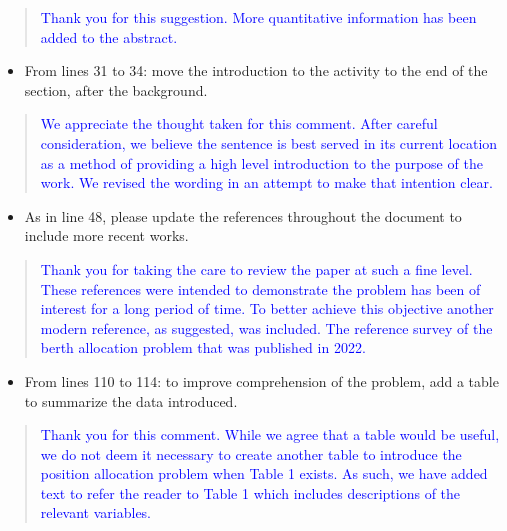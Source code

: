 \documentclass[11pt,a4paper,final]{article}
\begin{document}
\begin{quote}
  \textcolor{blue}{Thank you for this suggestion. More quantitative information has been added to the abstract.}
\end{quote}

\begin{itemize}
\item From lines 31 to 34: move the introduction to the activity to the end of the section, after the background.
\end{itemize}

\begin{quote}
  \textcolor{blue}{We appreciate the thought taken for this comment. After careful consideration, we believe the sentence is best served in its current location as a method of providing a high level introduction to the purpose of the work. We revised the wording in an attempt to make that intention clear.}
\end{quote}

\begin{itemize}
\item As in line 48, please update the references throughout the document to include more recent works.
\end{itemize}

\begin{quote}
  \textcolor{blue}{Thank you for taking the care to review the paper at such a fine level. These references were intended to demonstrate the problem has been of interest for a long period of time. To better achieve this objective another modern reference, as suggested, was included. The reference survey of the berth allocation problem that was published in 2022.}
\end{quote}

\begin{itemize}
\item From lines 110 to 114: to improve comprehension of the problem, add a table to summarize the data introduced.
\end{itemize}

\begin{quote}
  \textcolor{blue}{Thank you for this comment. While we agree that a table would be useful, we do not deem it necessary to create another table to introduce the position allocation problem when Table 1 exists. As such, we have added text to refer the reader to Table 1 which includes descriptions of the relevant variables.}
\end{quote}
\end{document}
